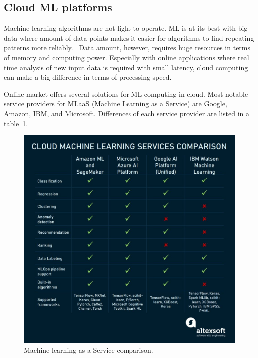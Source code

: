

\subsection{Cloud ML platforms}\label{subsec:bg-cloud-ml-platforms}

Machine learning algorithms are not light to operate.
ML is at its best with big data
where amount of data points
makes it easier for algorithms
to find repeating patterns more reliably.~\cite{zhou2017machine}
Data amount, however,
requires huge resources in terms of memory and computing power.
Especially with online applications
where real time analysis of new input data is required
with small latency,
cloud computing can make a big difference
in terms of processing speed.

Online market offers several solutions for ML computing in cloud.
Most notable service providers for
MLaaS (Machine Learning as a Service)
are Google, Amazon, IBM, and Microsoft.
Differences of each service provider are listed in a table~\ref{fig:mlaas-comparison}.

\begin{figure}[htb]
    \centering
    \includegraphics[width=150mm]{./appendices/mlaas-comparison}
    \caption{Machine learning as a Service comparison.~\cite{altexsoft2021mlaas}
    \label{fig:mlaas-comparison}}
\end{figure}

